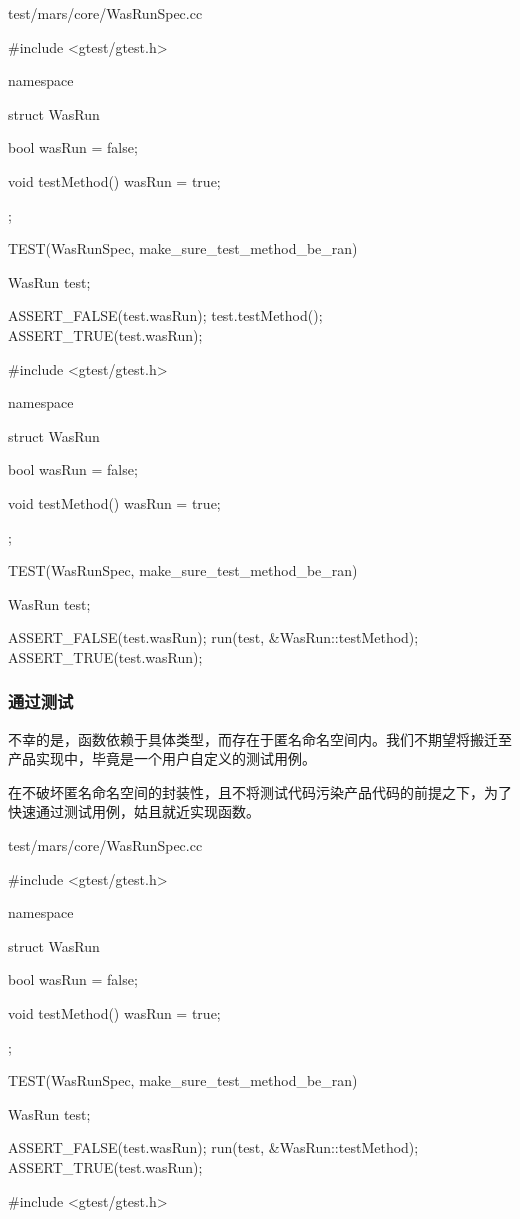 \begin{content}
\begin{diff}{test/mars/core/WasRunSpec.cc}
\begin{minicpp}
#include <gtest/gtest.h>

namespace {
  struct WasRun {
    bool wasRun = false;

    void testMethod() {
      wasRun = true;
    }
  };
}

TEST(WasRunSpec, make_sure_test_method_be_ran) {
  WasRun test;

  ASSERT_FALSE(test.wasRun);
  test.testMethod();
  ASSERT_TRUE(test.wasRun);
}
\end{minicpp}
\tcblower
\begin{minicpp}
#include <gtest/gtest.h>

namespace {
  struct WasRun {
    bool wasRun = false;

    void testMethod() {
      wasRun = true;
    }
  };
}

TEST(WasRunSpec, make_sure_test_method_be_ran) {
  WasRun test;

  ASSERT_FALSE(test.wasRun);
  run(test, &WasRun::testMethod);
  ASSERT_TRUE(test.wasRun);
}
\end{minicpp}
\end{diff}

\subsubsection{通过测试}

不幸的是，函数依赖于具体类型，而存在于匿名命名空间内。我们不期望将搬迁至产品实现中，毕竟是一个用户自定义的测试用例。

在不破坏匿名命名空间的封装性，且不将测试代码污染产品代码的前提之下，为了快速通过测试用例，姑且就近实现函数。

\begin{diff}{test/mars/core/WasRunSpec.cc}
\begin{minicpp}
#include <gtest/gtest.h>

namespace {
  struct WasRun {
    bool wasRun = false;

    void testMethod() {
      wasRun = true;
    }
  };
}

TEST(WasRunSpec, make_sure_test_method_be_ran) {
  WasRun test;

  ASSERT_FALSE(test.wasRun);
  run(test, &WasRun::testMethod);
  ASSERT_TRUE(test.wasRun);
}
\end{minicpp}
\tcblower
\begin{minicpp}
#include <gtest/gtest.h>


\end{minicpp}
\end{diff}
\end{content}
